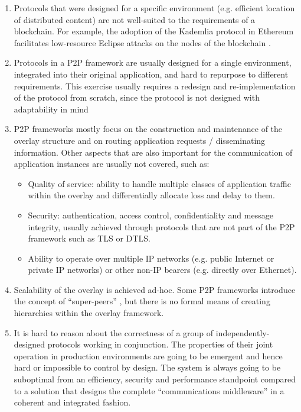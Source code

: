 \documentclass[11pt,a4paper]{article}
\begin{document}
\begin{enumerate}
\item
  Protocols that were designed for a specific environment (e.g.
  efficient location of distributed content) are not well-suited to the
  requirements of a blockchain. For example, the adoption of the
  Kademlia protocol in Ethereum facilitates low-resource Eclipse attacks
  on the nodes of the blockchain \cite{MHG15}.
\item
  Protocols in a P2P framework are usually designed for a single
  environment, integrated into their original application, and hard to
  repurpose to different requirements. This exercise usually requires a
  redesign and re-implementation of the protocol from scratch, since the
  protocol is not designed with adaptability in mind \cite{S19}
\item
  P2P frameworks mostly focus on the construction and maintenance of the
  overlay structure and on routing application requests / disseminating
  information. Other aspects that are also important for the
  communication of application instances are usually not covered, such
  as:

  \begin{itemize}
  \item
    Quality of service: ability to handle multiple classes of
    application traffic within the overlay and differentially allocate
    loss and delay to them.
  \item
    Security: authentication, access control, confidentiality and
    message integrity, usually achieved through protocols that are not
    part of the P2P framework such as TLS or DTLS.
  \item
    Ability to operate over multiple IP networks (e.g. public Internet
    or private IP networks) or other non-IP bearers (e.g. directly over
    Ethernet).
  \end{itemize}
\item
  Scalability of the overlay is achieved ad-hoc. Some P2P frameworks
  introduce the concept of ``super-peers'' \cite{M15}, but there is no
  formal means of creating hierarchies within the overlay framework.
\item
  It is hard to reason about the correctness of a group of
  independently-designed protocols working in conjunction. The
  properties of their joint operation in production environments are
  going to be emergent and hence hard or impossible to control by
  design. The system is always going to be suboptimal from an
  efficiency, security and performance standpoint compared to a solution
  that designs the complete ``communications middleware'' in a coherent
  and integrated fashion.
\end{enumerate}
\end{document}

